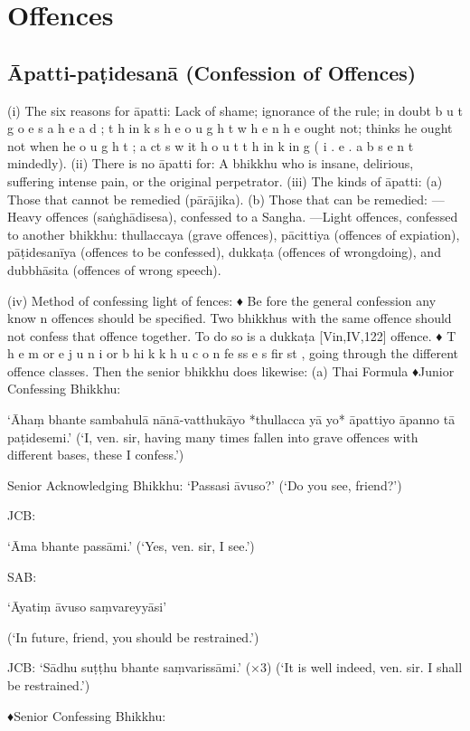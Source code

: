 \chapter{Offences}

\section{Āpatti-paṭidesanā (Confession of Offences)}

(i) The six reasons for āpatti:
Lack of shame; ignorance of the rule; in doubt
b u t g o e s a h e a d ; t h in k s h e o u g h t w h e n h e
ought not; thinks he ought not when he
o u g h t ; a ct s w it h o u t t h in k in g ( i . e . a b s e n t mindedly).
(ii) There is no āpatti for:
A bhikkhu who is insane, delirious, suffering
intense pain, or the original perpetrator.
(iii) The kinds of āpatti:
(a) Those that cannot be remedied (pārājika).
(b) Those that can be remedied:
—Heavy offences (saṅghādisesa),
confessed to a Sangha.
—Light offences, confessed to another bhikkhu:
thullaccaya (grave offences), pācittiya
(offences of expiation), pāṭidesanīya (offences
to be confessed), dukkaṭa (offences of wrongdoing), and dubbhāsita (offences of wrong
speech).

(iv) Method of confessing light of fences:
♦ Be fore the general confession any know n
offences should be specified. Two bhikkhus
with the same offence should not confess that
offence together. To do so is a dukkaṭa
[Vin,IV,122]
offence.
♦ T h e m or e j u n i or b hi k k h u c o n fe ss e s fir st ,
going through the different offence classes.
Then the senior bhikkhu does likewise:
(a) Thai Formula
♦Junior Confessing Bhikkhu:

‘Āhaṃ bhante sambahulā nānā-vatthukāyo
*thullacca yā yo* āpattiyo āpanno tā
paṭidesemi.’
(‘I, ven. sir, having many times fallen into grave
offences with different bases, these I confess.’)

Senior Acknowledging Bhikkhu:
‘Passasi āvuso?’
(‘Do you see, friend?’)

JCB:

‘Āma bhante passāmi.’
(‘Yes, ven. sir, I see.’)

SAB:

‘Āyatiṃ āvuso saṃvareyyāsi’

(‘In future, friend, you should be restrained.’)

JCB: ‘Sādhu suṭṭhu bhante saṃvarissāmi.’ (×3)
(‘It is well indeed, ven. sir. I shall be restrained.’)

♦Senior Confessing Bhikkhu:

